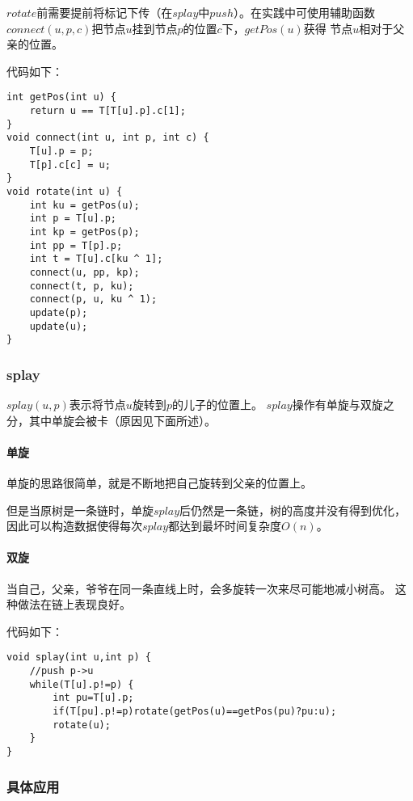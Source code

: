 $rotate$前需要提前将标记下传（在$splay$中$push$）。在实践中可使用辅助函数
$connect(u,p,c)$把节点$u$挂到节点$p$的位置$c$下，$getPos(u)$获得
节点$u$相对于父亲的位置。

代码如下：

\begin{lstlisting}[title=rotate]
int getPos(int u) {
    return u == T[T[u].p].c[1];
}
void connect(int u, int p, int c) {
    T[u].p = p;
    T[p].c[c] = u;
}
void rotate(int u) {
    int ku = getPos(u);
    int p = T[u].p;
    int kp = getPos(p);
    int pp = T[p].p;
    int t = T[u].c[ku ^ 1];
    connect(u, pp, kp);
    connect(t, p, ku);
    connect(p, u, ku ^ 1);
    update(p);
    update(u);
}
\end{lstlisting}

\subsubsection{splay}

$splay(u,p)$表示将节点$u$旋转到$p$的儿子的位置上。
$splay$操作有单旋与双旋之分，其中单旋会被卡（原因见下面所述）。

\paragraph{单旋}

单旋的思路很简单，就是不断地把自己旋转到父亲的位置上。

但是当原树是一条链时，单旋$splay$后仍然是一条链，树的高度并没有得到优化，
因此可以构造数据使得每次$splay$都达到最坏时间复杂度$O(n)$。

\paragraph{双旋}

当自己，父亲，爷爷在同一条直线上时，会多旋转一次来尽可能地减小树高。
这种做法在链上表现良好。

代码如下：

\begin{lstlisting}[title=splay]
void splay(int u,int p) {
    //push p->u
    while(T[u].p!=p) {
        int pu=T[u].p;
        if(T[pu].p!=p)rotate(getPos(u)==getPos(pu)?pu:u);
        rotate(u);
    }
}
\end{lstlisting}

\subsubsection{具体应用}

